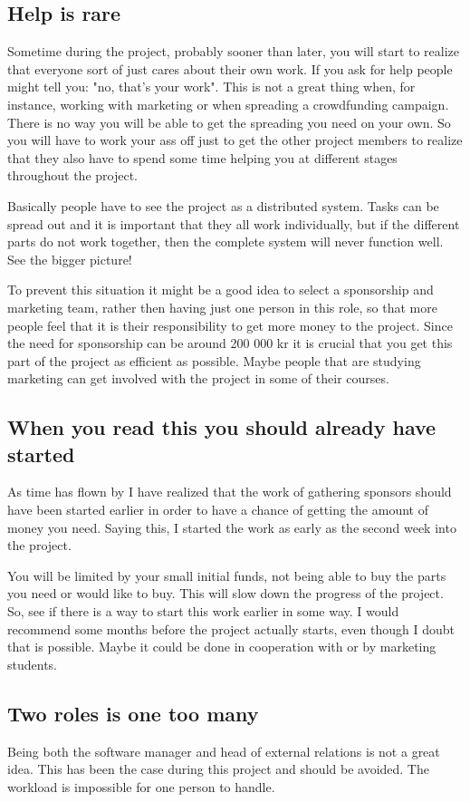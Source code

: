\subsection{Help is rare}
Sometime during the project, probably sooner than later, you will start to realize that everyone sort of just cares about their own work. If you ask for help people might tell you: "no, that's your work". This is not a great thing when, for instance,  working with marketing or when spreading a crowdfunding campaign. There is no way you will be able to get the spreading you need on your own. So you will have to work your ass off just to get the other project members to realize that they also have to spend some time helping you at different stages throughout the project. 

Basically people have to see the project as a distributed system. Tasks can be spread out and it is important that they all work individually, but if the different parts do not work together, then the complete system will never function well. See the bigger picture! 

To prevent this situation it might be a good idea to select a sponsorship and marketing team, rather then having just one person in this role, so that more people feel that it is their responsibility to get more money to the project. Since the need for sponsorship can be around 200 000 kr it is crucial that you get this part of the project as efficient as possible. Maybe people that are studying marketing can get involved with the project in some of their courses. 

\subsection{When you read this you should already have started}
As time has flown by I have realized that the work of gathering sponsors should have been started earlier in order to have a chance of getting the amount of money you need. Saying this, I started the work as early as the second week into the project. 

You will be limited by your small initial funds, not being able to buy the parts you need or would like to buy. This will slow down the progress of the project. So, see if there is a way to start this work earlier in some way. I would recommend some months before the project actually starts, even though I doubt that is possible. Maybe it could be done in cooperation with or by marketing students.
\pagebreak
\subsection{Two roles is one too many}
Being both the software manager and head of external relations is not a great idea. This has been the case during this project and should be avoided. The workload is impossible for one person to handle.